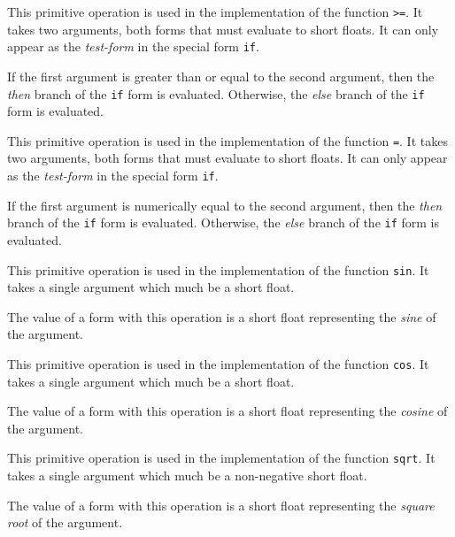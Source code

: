 
This primitive operation is used in the implementation of the
\commonlisp{} function \texttt{>=}.  It takes two arguments, both forms
that must evaluate to short floats.  It can only appear as the
\emph{test-form} in the special form \texttt{if}.

If the first argument is greater than or equal to the second argument,
then the \emph{then} branch of the \texttt{if} form is evaluated.
Otherwise, the \emph{else} branch of the \texttt{if} form is
evaluated.


This primitive operation is used in the implementation of the
\commonlisp{} function \texttt{=}.  It takes two arguments, both forms
that must evaluate to short floats.  It can only appear as the
\emph{test-form} in the special form \texttt{if}.

If the first argument is numerically equal to the second argument,
then the \emph{then} branch of the \texttt{if} form is evaluated.
Otherwise, the \emph{else} branch of the \texttt{if} form is
evaluated.


This primitive operation is used in the implementation of the
\commonlisp{} function \texttt{sin}.  It takes a single argument which
much be a short float.

The value of a form with this operation is a short float representing
the \emph{sine} of the argument.


This primitive operation is used in the implementation of the
\commonlisp{} function \texttt{cos}.  It takes a single argument which
much be a short float.

The value of a form with this operation is a short float representing
the \emph{cosine} of the argument.


This primitive operation is used in the implementation of the
\commonlisp{} function \texttt{sqrt}.  It takes a single argument which
much be a non-negative short float.

The value of a form with this operation is a short float representing
the \emph{square root} of the argument.
